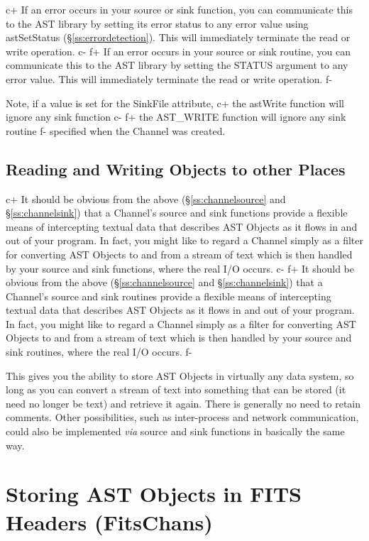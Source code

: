 \documentclass[twoside,11pt]{article}
\newcommand{\secref}[1]{\S\ref{#1}}
\newcommand{\secref}[1]{\ref{#1}}
\begin{document}
c+
If an error occurs in your source or sink function, you can
communicate this to the AST library by setting its error status to any
error value using astSetStatus (\secref{ss:errordetection}). This will
immediately terminate the read or write operation.
c-
f+
If an error occurs in your source or sink routine, you can communicate
this to the AST library by setting the STATUS argument to any error
value. This will immediately terminate the read or write operation.
f-

Note, if a value is set for the SinkFile attribute,
c+
the astWrite function will ignore any sink function
c-
f+
the AST\_WRITE function will ignore any sink routine
f-
specified when the Channel was created.

\subsection{\label{ss:otherplaces}Reading and Writing Objects to other Places}

c+
It should be obvious from the above (\secref{ss:channelsource} and
\secref{ss:channelsink}) that a Channel's source and sink functions
provide a flexible means of intercepting textual data that describes
AST Objects as it flows in and out of your program. In fact, you might
like to regard a Channel simply as a filter for converting AST Objects
to and from a stream of text which is then handled by your source and
sink functions, where the real I/O occurs.
c-
f+
It should be obvious from the above (\secref{ss:channelsource} and
\secref{ss:channelsink}) that a Channel's source and sink routines
provide a flexible means of intercepting textual data that describes
AST Objects as it flows in and out of your program. In fact, you might
like to regard a Channel simply as a filter for converting AST Objects
to and from a stream of text which is then handled by your source and
sink routines, where the real I/O occurs.
f-

This gives you the ability to store AST Objects in virtually any data
system, so long as you can convert a stream of text into something
that can be stored (it need no longer be text) and retrieve it
again. There is generally no need to retain comments.  Other
possibilities, such as inter-process and network communication, could
also be implemented {\em{via}} source and sink functions in basically
the same way.

\cleardoublepage
\section{\label{ss:nativefits}Storing AST Objects in FITS Headers (FitsChans)}
\end{document}
